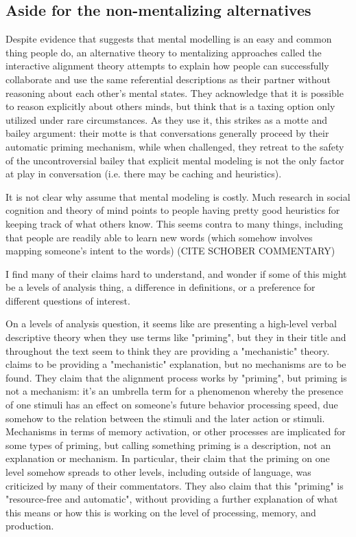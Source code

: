 \documentclass[]{article}
\begin{document}
\subsection{Aside for the non-mentalizing alternatives} 
Despite evidence that suggests that mental modelling is an easy and common thing people do, an alternative theory to mentalizing approaches called the interactive alignment theory attempts to explain how people can successfully collaborate and use the same referential descriptions as their partner without reasoning about each other's mental states. They acknowledge that it is possible to reason explicitly about others minds, but think that is a taxing option only utilized under rare circumstances. As they use it, this strikes as a motte and bailey argument: their motte is that conversations generally proceed by their automatic priming mechanism, while when challenged, they retreat to the safety of the uncontroversial bailey that explicit mental modeling is not the only factor at play in conversation (i.e. there may be caching and heuristics).  

It is not clear why \cite{pickering2004} assume that mental modeling is costly. Much research in social cognition and theory of mind points to people having pretty good heuristics for keeping track of what others know. This seems contra to many things, including that people are readily able to learn new words (which somehow involves mapping someone's intent to the words) (CITE SCHOBER COMMENTARY)

I find many of their claims hard to understand, and wonder if some of this might be a levels of analysis thing, a difference in definitions, or a preference for different questions of interest. 

On a levels of analysis question, it seems like \cite{pickering2004} are presenting a high-level verbal descriptive theory when they use terms like "priming", but they in their title and throughout the text seem to think they are providing a "mechanistic" theory. \cite{pickering2004} claims to be providing a "mechanistic" explanation, but no mechanisms are to be found. They claim that the alignment process works by "priming", but priming is not a mechanism: it's an umbrella term for a phenomenon whereby the presence of one stimuli has an effect on someone's future behavior processing speed, due somehow to the relation between the stimuli and the later action or stimuli. Mechanisms in terms of memory activation, or other processes are implicated for some types of priming, but calling something priming is a description, not an explanation or mechanism. In particular, their claim that the priming on one level somehow spreads to other levels, including outside of language, was criticized by many of their commentators. They also claim that this "priming" is "resource-free and automatic", without providing a further explanation of what this means or how this is working on the level of processing, memory, and production. 
\end{document}

